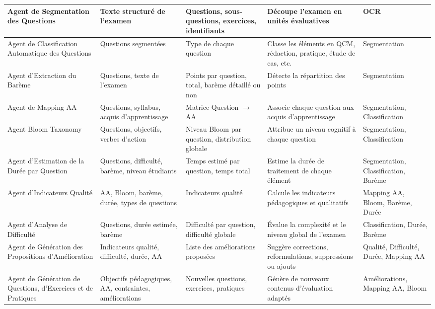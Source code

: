 \documentclass[12pt,a4paper]{article}
\begin{document}
\begin{center}
\begin{longtable}{|p{3.2cm}|p{3.2cm}|p{3.2cm}|p{4.8cm}|p{2.8cm}|}
Agent de Segmentation des Questions
& Texte structuré de l’examen
& Questions, sous-questions, exercices, identifiants
& Découpe l’examen en unités évaluatives
& OCR \\ \hline

Agent de Classification Automatique des Questions
& Questions segmentées
& Type de chaque question
& Classe les éléments en QCM, rédaction, pratique, étude de cas, etc.
& Segmentation \\ \hline

Agent d’Extraction du Barème
& Questions, texte de l’examen
& Points par question, total, barème détaillé ou non
& Détecte la répartition des points
& Segmentation \\ \hline

Agent de Mapping AA
& Questions, syllabus, acquis d’apprentissage
& Matrice Question $\rightarrow$ AA
& Associe chaque question aux acquis d’apprentissage
& Segmentation, Classification \\ \hline

Agent Bloom Taxonomy
& Questions, objectifs, verbes d’action
& Niveau Bloom par question, distribution globale
& Attribue un niveau cognitif à chaque question
& Segmentation, Classification \\ \hline

Agent d’Estimation de la Durée par Question
& Questions, difficulté, barème, niveau étudiants
& Temps estimé par question, temps total
& Estime la durée de traitement de chaque élément
& Segmentation, Classification, Barème \\ \hline

Agent d’Indicateurs Qualité
& AA, Bloom, barème, durée, types de questions
& Indicateurs qualité
& Calcule les indicateurs pédagogiques et qualitatifs
& Mapping AA, Bloom, Barème, Durée \\ \hline

Agent d’Analyse de Difficulté
& Questions, durée estimée, barème
& Difficulté par question, difficulté globale
& Évalue la complexité et le niveau global de l’examen
& Classification, Durée, Barème \\ \hline

Agent de Génération des Propositions d’Amélioration
& Indicateurs qualité, difficulté, durée, AA
& Liste des améliorations proposées
& Suggère corrections, reformulations, suppressions ou ajouts
& Qualité, Difficulté, Durée, Mapping AA \\ \hline

Agent de Génération de Questions, d’Exercices et de Pratiques
& Objectifs pédagogiques, AA, contraintes, améliorations
& Nouvelles questions, exercices, pratiques
& Génère de nouveaux contenus d’évaluation adaptés
& Améliorations, Mapping AA, Bloom \\ \hline


\end{longtable}
\end{center}
\end{document}
